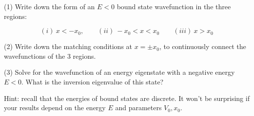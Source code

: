 (1) Write down the form of an $E<0$ bound state wavefunction in the three regions:

\[
  (i)~x<-x_0, 
  \qquad
  (ii)~-x_0<x<x_0 
  \qquad (iii)~x>x_0
\]

(2) Write down the matching conditions at $x=\pm x_0$, to continuously connect the wavefunctions of the 3 regions. 

(3) Solve for the wavefunction of an energy eigenstate with a negative energy $E<0$. What is the inversion eigenvalue of this state?

Hint: recall that the energies of bound states are discrete. It won't be surprising if your results depend on the energy $E$ and parameters $V_0,x_0$.